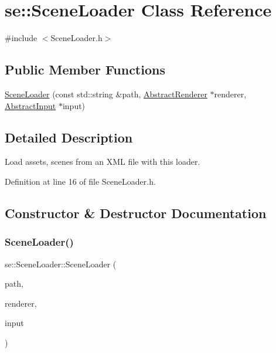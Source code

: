 \hypertarget{classse_1_1_scene_loader}{}\section{se\+:\+:Scene\+Loader Class Reference}
\label{classse_1_1_scene_loader}


{\ttfamily \#include $<$Scene\+Loader.\+h$>$}

\subsection*{Public Member Functions}
\begin{DoxyCompactItemize}
\item 
\mbox{\hyperlink{classse_1_1_scene_loader_a2e0309a75a10c4446aa77e0b29264d4d}{Scene\+Loader}} (const std\+::string \&path, \mbox{\hyperlink{classse_1_1_abstract_renderer}{Abstract\+Renderer}} $\ast$renderer, \mbox{\hyperlink{classse_1_1_abstract_input}{Abstract\+Input}} $\ast$input)
\end{DoxyCompactItemize}


\subsection{Detailed Description}
Load assets, scenes from an X\+ML file with this loader. 

Definition at line 16 of file Scene\+Loader.\+h.



\subsection{Constructor \& Destructor Documentation}
\mbox{\label{classse_1_1_scene_loader_a2e0309a75a10c4446aa77e0b29264d4d}} 
\subsubsection{\texorpdfstring{Scene\+Loader()}{SceneLoader()}}
{\footnotesize\ttfamily se\+::\+Scene\+Loader\+::\+Scene\+Loader (\begin{DoxyParamCaption}\item[{const std\+::string \&}]{path,  }\item[{\mbox{\hyperlink{classse_1_1_abstract_renderer}{Abstract\+Renderer}} $\ast$}]{renderer,  }\item[{\mbox{\hyperlink{classse_1_1_abstract_input}{Abstract\+Input}} $\ast$}]{input }\end{DoxyParamCaption})}

